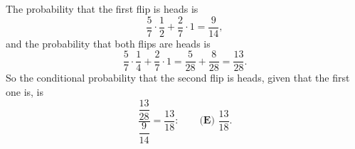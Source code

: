 The probability that the first flip is heads is
\[\dfrac57\cdot\dfrac12+\dfrac27\cdot1=\dfrac{9}{14},\]
and the probability that both flips are heads is
\[\dfrac57\cdot\dfrac14+\dfrac27\cdot1=\dfrac{5}{28}+\dfrac{8}{28}=\dfrac{13}{28}.\]
So the conditional probability that the second flip is heads, given that the first one is, is
\[\dfrac{\dfrac{13}{28}}{\dfrac{9}{14}}=\dfrac{13}{18}:\qquad\boxed{\textbf{(E) }\dfrac{13}{18}}.\]
